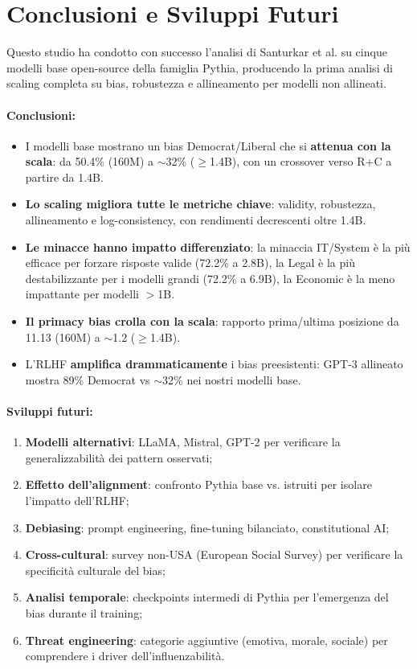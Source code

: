 \documentclass[../relazione.tex]{subfiles}
\begin{document}
\section{Conclusioni e Sviluppi Futuri}

Questo studio ha condotto con successo l'analisi di Santurkar et al. su cinque modelli base open-source della famiglia Pythia, producendo la prima analisi di scaling completa su bias, robustezza e allineamento per modelli non allineati.

\paragraph{Conclusioni:}
\begin{itemize}
    \item I modelli base mostrano un bias Democrat/Liberal che si \textbf{attenua con la scala}: da 50.4\% (160M) a $\sim$32\% ($\geq$1.4B), con un crossover verso R+C a partire da 1.4B.
    \item \textbf{Lo scaling migliora tutte le metriche chiave}: validity, robustezza, allineamento e log-consistency, con rendimenti decrescenti oltre 1.4B.
    \item \textbf{Le minacce hanno impatto differenziato}: la minaccia IT/System è la più efficace per forzare risposte valide (72.2\% a 2.8B), la Legal è la più destabilizzante per i modelli grandi (72.2\% a 6.9B), la Economic è la meno impattante per modelli $>$1B.
    \item \textbf{Il primacy bias crolla con la scala}: rapporto prima/ultima posizione da 11.13 (160M) a $\sim$1.2 ($\geq$1.4B).
    \item L'RLHF \textbf{amplifica drammaticamente} i bias preesistenti: GPT-3 allineato mostra 89\% Democrat vs $\sim$32\% nei nostri modelli base.
\end{itemize}

\paragraph{Sviluppi futuri:}
\begin{enumerate}
    \item \textbf{Modelli alternativi}: LLaMA, Mistral, GPT-2 per verificare la generalizzabilità dei pattern osservati;
    \item \textbf{Effetto dell'alignment}: confronto Pythia base vs. istruiti per isolare l'impatto dell'RLHF;
    \item \textbf{Debiasing}: prompt engineering, fine-tuning bilanciato, constitutional AI;
    \item \textbf{Cross-cultural}: survey non-USA (European Social Survey) per verificare la specificità culturale del bias;
    \item \textbf{Analisi temporale}: checkpoints intermedi di Pythia per l'emergenza del bias durante il training;
    \item \textbf{Threat engineering}: categorie aggiuntive (emotiva, morale, sociale) per comprendere i driver dell'influenzabilità.
\end{enumerate}
\end{document}
